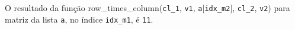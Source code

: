 \documentclass[12pt,varwidth=16cm,border=1pt]{standalone}
\begin{document}
O resultado da função row\_times\_column(\verb+cl_1+, \verb+v1+, \verb+a+[\verb+idx_m2+], \verb+cl_2+, \verb+v2+) para matriz da lista \verb+a+, no índice \verb+idx_m1+, é \verb+11+.

\questiomtrue
\end{document}
